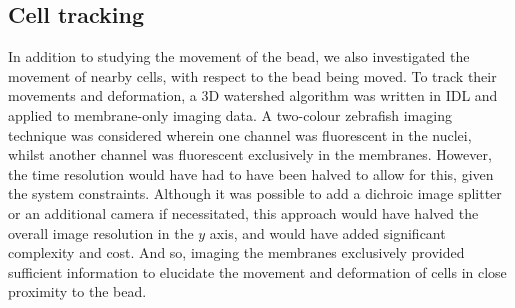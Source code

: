 \subsection{Cell tracking}

In addition to studying the movement of the bead, we also investigated the movement of nearby cells, with respect to the bead being moved.
To track their movements and deformation, a 3D watershed algorithm was written in IDL and applied to membrane-only imaging data.
A two-colour \gls{zebrafish} imaging technique was considered wherein one channel was fluorescent in the nuclei, whilst another channel was fluorescent exclusively in the membranes.
However, the time resolution would have had to have been halved to allow for this, given the system constraints.
Although it was possible to add a dichroic image splitter or an additional camera if necessitated, this approach would have halved the overall image resolution in the \(y\) axis, and would have added significant complexity and cost.
And so, imaging the membranes exclusively provided sufficient information to elucidate the movement and deformation of cells in close proximity to the bead.


